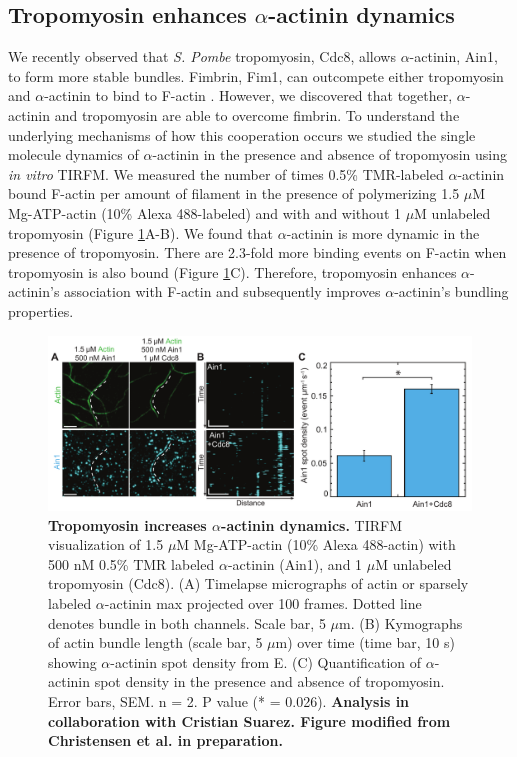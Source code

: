 \subsection{Tropomyosin enhances \texorpdfstring{$\alpha$}{a}-actinin dynamics}
We recently observed that \textit{S. Pombe} tropomyosin, Cdc8, allows $\alpha$-actinin, Ain1, to form more stable bundles. Fimbrin, Fim1, can outcompete either tropomyosin and $\alpha$-actinin to bind to F-actin \citep{christensen_competition_2017}. However, we discovered that together, $\alpha$-actinin and tropomyosin are able to overcome fimbrin. To understand the underlying mechanisms of how this cooperation occurs we studied the single molecule dynamics of $\alpha$-actinin in the presence and absence of tropomyosin using \textit{in vitro} TIRFM. We measured the number of times 0.5\% TMR-labeled $\alpha$-actinin bound F-actin per amount of filament in the presence of polymerizing 1.5 $\mu$M Mg-ATP-actin (10\% Alexa 488-labeled) and with and without 1 $\mu$M unlabeled tropomyosin (Figure \ref{fig:tropo_aact}A-B). We found that $\alpha$-actinin is more dynamic in the presence of tropomyosin. There are 2.3-fold more binding events on F-actin when tropomyosin is also bound (Figure \ref{fig:tropo_aact}C). Therefore, tropomyosin enhances $\alpha$-actinin's association with F-actin and subsequently improves $\alpha$-actinin's bundling properties. 

\begin{figure}
\centering
\includegraphics[width=\textwidth]{img/ch03/Thesis_aact_dynamics.pdf}
\caption[Tropomyosin increases \texorpdfstring{$\alpha$}{alpha}-actinin dynamics.]{\textbf{Tropomyosin increases $\alpha$-actinin dynamics.} TIRFM visualization of 1.5 $\mu$M Mg-ATP-actin (10\% Alexa 488-actin) with 500 nM 0.5\% TMR labeled $\alpha$-actinin (Ain1), and 1 $\mu$M unlabeled tropomyosin (Cdc8). (A) Timelapse micrographs of actin or sparsely labeled $\alpha$-actinin max projected over 100 frames. Dotted line denotes bundle in both channels. Scale bar, 5 $\mu$m. (B) Kymographs of actin bundle length (scale bar, 5 $\mu$m) over time (time bar, 10 s) showing $\alpha$-actinin spot density from E. (C) Quantification of $\alpha$-actinin spot density in the presence and absence of tropomyosin. Error bars, SEM. n = 2. P value (* = 0.026). \textbf{Analysis in collaboration with Cristian Suarez. Figure modified from Christensen et al. in preparation.}}
\label{fig:tropo_aact}
\end{figure}


